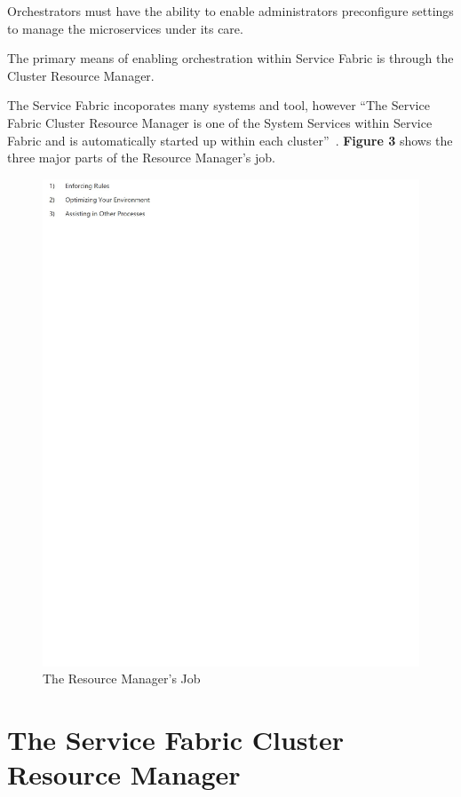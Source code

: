 Orchestrators must have the ability to enable administrators
preconfigure settings to manage the microservices
under its care.

The primary means of enabling orchestration within Service Fabric is
through the Cluster Resource Manager.

The Service Fabric incoporates many systems and tool, however
``The Service Fabric 
Cluster Resource Manager is one of the System
Services within Service Fabric and is automatically started up within
each cluster''~\cite{hid-sp18-501-fig2and3}.  
{\bf Figure 3} shows the three major parts of the Resource Manager's job.

\begin{figure}[!ht]
  \centering\includegraphics[width=\columnwidth]{images/fig3.pdf}
  \caption{The Resource Manager's Job~\cite{hid-sp18-501-fig2and3}}
\label{f:architecture}
\end{figure}


\section{The Service Fabric Cluster Resource Manager}

